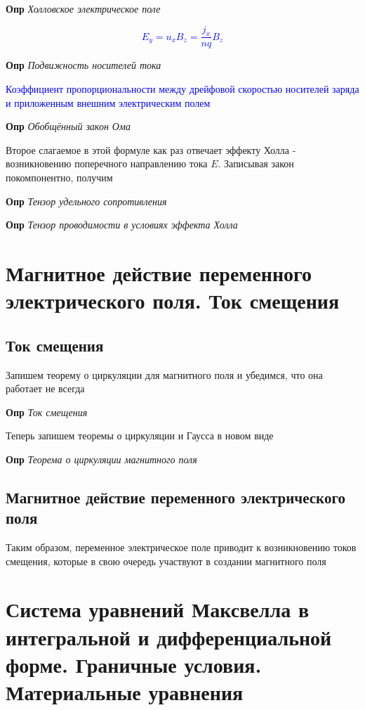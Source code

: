 \documentclass[a4paper, 14pt]{article}
\begin{document}
    \textbf{Опр} \textit{Холловское электрическое поле}
    
    \textcolor{blue}{\[ E_y = u_x B_z = \frac{j_x}{nq} B_z \]}
    
    \textbf{Опр} \textit{Подвижность носителей тока}
    
    \textcolor{blue}{Коэффициент пропорциональности между дрейфовой скоростью носителей заряда и приложенным внешним
    электрическим полем}
    
    \textbf{Опр} \textit{Обобщённый закон Ома}
    
    Второе слагаемое в этой формуле как раз отвечает эффекту Холла - возникновению поперечного направлению тока $E$.
    Записывая закон покомпонентно, получим
    
    \textbf{Опр} \textit{Тензор удельного сопротивления}
    
    \textbf{Опр} \textit{Тензор проводимости в условиях эффекта Холла}
    
    \section{Магнитное действие переменного электрического поля.
    Ток смещения}
    
    \subsection{Ток смещения}
    
    Запишем теорему о циркуляции для магнитного поля и убедимся, что она работает не всегда
    
    \textbf{Опр} \textit{Ток смещения}
    
    Теперь запишем теоремы о циркуляции и Гаусса в новом виде
    
    \textbf{Опр} \textit{Теорема о циркуляции магнитного поля}
    
    \subsection{Магнитное действие переменного электрического поля}
    
    Таким образом, переменное электрическое поле приводит к возникновению токов смещения, которые в свою очередь
    участвуют в создании магнитного поля
    
    \section{Система уравнений Максвелла в интегральной и дифференциальной форме.
    Граничные условия.
    Материальные уравнения}
    
\end{document}
